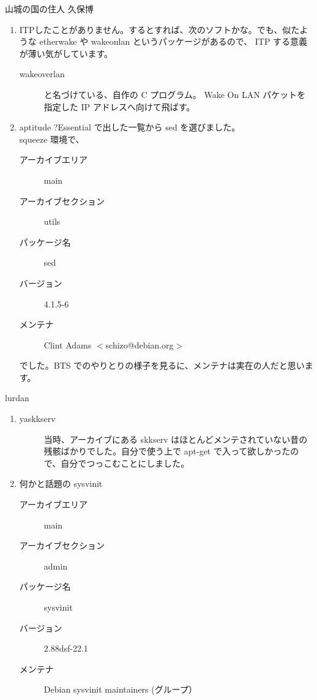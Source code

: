 \documentclass[mingoth,a4paper]{jsarticle}
\begin{document}
\begin{prework}{ 山城の国の住人 久保博 }
  \begin{enumerate}
  \item ITPしたことがありません。するとすれば、次のソフトかな。でも、似たような etherwake や wakeonlan というパッケージがあるので、 ITP する意義が薄い気がしています。
    \begin{description}
    \item [wakeoverlan] と名づけている、自作の C プログラム。 Wake On LAN パケットを指定した IP アドレスへ向けて飛ばす。
    \end{description}
  \item aptitude ?Essential で出した一覧から sed を選びました。\\
    squeeze 環境で、
    \begin{description}
    \item [アーカイブエリア] main
    \item [アーカイブセクション] utils
    \item [パッケージ名] sed
    \item [バージョン] 4.1.5-6
    \item [メンテナ] Clint Adams $<$schizo@debian.org$>$
    \end{description}
    でした。BTS でのやりとりの様子を見るに、メンテナは実在の人だと思います。
  \end{enumerate}
\end{prework}

\begin{prework}{ lurdan }
  \begin{enumerate}
  \item
    \begin{description}
    \item [yaskkserv] 当時、アーカイブにある skkserv はほとんどメンテされていない昔の残骸ばかりでした。自分で使う上で apt-get で入って欲しかったので、自分でつっこむことにしました。
    \end{description}
  \item 何かと話題の sysvinit
    \begin{description}
    \item [アーカイブエリア] main
    \item [アーカイブセクション] admin
    \item [パッケージ名] sysvinit
    \item [バージョン] 2.88dsf-22.1
    \item [メンテナ] Debian sysvinit maintainers (グループ）
    \end{description}
  \end{enumerate}
\end{prework}
\end{document}
